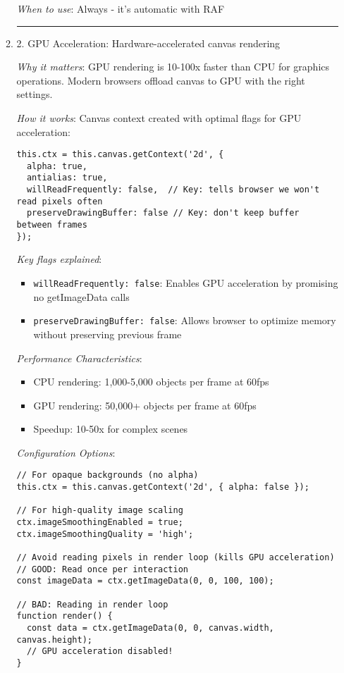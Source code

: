 \documentclass[11pt]{article}
\begin{document}
\begin{enumerate}
\begin{enumerate}
\emph{When to use}: Always - it's automatic with RAF

\noindent\rule{\textwidth}{0.5pt}
\item 2. GPU Acceleration: Hardware-accelerated canvas rendering
\label{sec:org2b27172}

\emph{Why it matters}: GPU rendering is 10-100x faster than CPU for graphics operations. Modern browsers offload canvas to GPU with the right settings.

\emph{How it works}: Canvas context created with optimal flags for GPU acceleration:
\begin{verbatim}
this.ctx = this.canvas.getContext('2d', {
  alpha: true,
  antialias: true,
  willReadFrequently: false,  // Key: tells browser we won't read pixels often
  preserveDrawingBuffer: false // Key: don't keep buffer between frames
});
\end{verbatim}

\emph{Key flags explained}:
\begin{itemize}
\item \texttt{willReadFrequently: false}: Enables GPU acceleration by promising no getImageData calls
\item \texttt{preserveDrawingBuffer: false}: Allows browser to optimize memory without preserving previous frame
\end{itemize}

\emph{Performance Characteristics}:
\begin{itemize}
\item CPU rendering: 1,000-5,000 objects per frame at 60fps
\item GPU rendering: 50,000+ objects per frame at 60fps
\item Speedup: 10-50x for complex scenes
\end{itemize}

\emph{Configuration Options}:
\begin{verbatim}
// For opaque backgrounds (no alpha)
this.ctx = this.canvas.getContext('2d', { alpha: false });

// For high-quality image scaling
ctx.imageSmoothingEnabled = true;
ctx.imageSmoothingQuality = 'high';

// Avoid reading pixels in render loop (kills GPU acceleration)
// GOOD: Read once per interaction
const imageData = ctx.getImageData(0, 0, 100, 100);

// BAD: Reading in render loop
function render() {
  const data = ctx.getImageData(0, 0, canvas.width, canvas.height);
  // GPU acceleration disabled!
}
\end{verbatim}


\end{enumerate}
\end{enumerate}
\end{document}
